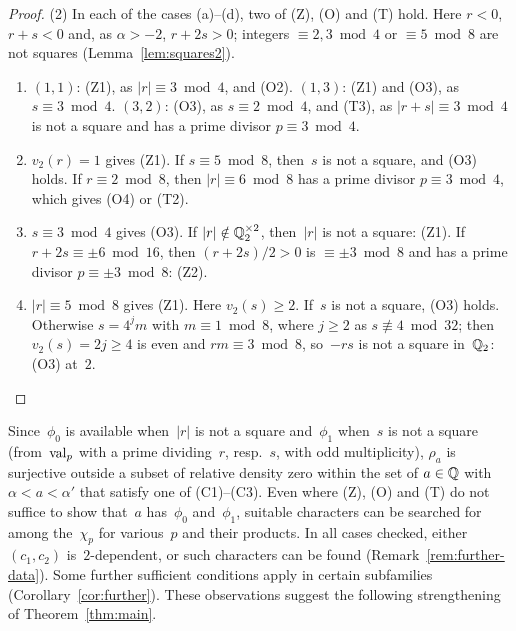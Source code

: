 \begin{proof}
  (2) In each of the cases (a)--(d), two of (Z), (O) and (T) hold. Here $r < 0$, $r + s < 0$ and,
  as $\alpha > -2$, $r + 2s > 0$; integers $\equiv 2, 3 \bmod 4$ or $\equiv 5 \bmod 8$ are not
  squares (Lemma~\ref{lem:squares2}).
  \begin{enumerate}
    \item[(a)] $(1,1)$: (Z1), as $|r| \equiv 3 \bmod 4$, and (O2). $(1,3)$: (Z1) and (O3), as
          $s \equiv 3 \bmod 4$. $(3,2)$: (O3), as $s \equiv 2 \bmod 4$, and (T3), as
          $|r + s| \equiv 3 \bmod 4$ is not a square and has a prime divisor
          $p \equiv 3 \bmod 4$.
    \item[(b)] $v_2(r) = 1$ gives (Z1). If $s \equiv 5 \bmod 8$, then~$s$ is not a square, and
          (O3) holds. If $r \equiv 2 \bmod 8$, then $|r| \equiv 6 \bmod 8$ has a prime
          divisor $p \equiv 3 \bmod 4$, which gives (O4) or (T2).
    \item[(c)] $s \equiv 3 \bmod 4$ gives (O3). If $|r| \notin \mathbb{Q}_2^{\times 2}$, then~$|r|$
          is not a square: (Z1). If $r + 2s \equiv \pm 6 \bmod 16$, then $(r + 2s)/2 > 0$ is
          $\equiv \pm 3 \bmod 8$ and has a prime divisor $p \equiv \pm 3 \bmod 8$: (Z2).
    \item[(d)] $|r| \equiv 5 \bmod 8$ gives (Z1). Here $v_2(s) \ge 2$. If~$s$ is not a square,
          (O3) holds. Otherwise $s = 4^j m$ with $m \equiv 1 \bmod 8$, where $j \ge 2$ as
          $s \not\equiv 4 \bmod 32$; then $v_2(s) = 2j \ge 4$ is even and $r m \equiv 3 \bmod 8$,
          so~$-rs$ is not a square in~$\mathbb{Q}_2$: (O3) at~$2$. \qedhere
  \end{enumerate}
\end{proof}

Since~$\phi_0$ is available when~$|r|$ is not a square and~$\phi_1$ when~$s$ is not a square
(from~$\operatorname{val}_p$ with a prime dividing~$r$, resp.\ $s$, with odd multiplicity), $\rho_a$ is
surjective outside a subset of relative density zero within the set of $a \in \mathbb{Q}$ with
$\alpha < a < \alpha'$ that satisfy one of (C1)--(C3). Even where (Z), (O) and (T) do not
suffice to show that~$a$ has~$\phi_0$ and~$\phi_1$, suitable characters can be searched for among
the~$\chi_p$ for various~$p$ and their products. In all cases checked, either $(c_1, c_2)$
is~$2$-dependent, or such characters can be found (Remark~\ref{rem:further-data}). Some further
sufficient conditions apply in certain subfamilies (Corollary~\ref{cor:further}). These
observations suggest the following strengthening of Theorem~\ref{thm:main}.

